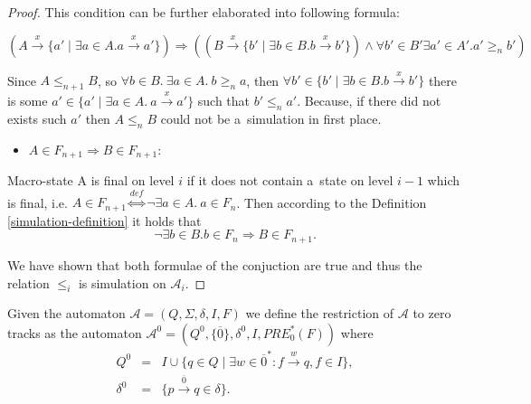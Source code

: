 \begin{proof}
 This condition can be further elaborated into following formula:
 
 \begin{equation}
 (A \overset{x}{\rightarrow} \{a' \mid \exists a \in A. a
 \overset{x}{\rightarrow} a'\}) \Rightarrow ( (B \overset{x}{\rightarrow}
 \{b' \mid \exists b \in B. b \overset{x}{\rightarrow} b'\}) \wedge \forall b'
 \in B' \exists a' \in A'. a' \geq_n b')
 \end{equation}
 
 Since $A \leq_{n+1} B$, so $\forall b \in B.\ \exists a \in A.\ b \geq_n a$,
 then $\forall b' \in \{b' \mid \exists b \in B. b \overset{x}{\rightarrow} b'\}$
 there is some $a' \in \{a' \mid \exists a \in A.\ a \overset{x}{\rightarrow}
 a'\}$ such that $b' \leq_n a'$. Because, if there did not exists such $a'$ then
 $A \leq_n B$ could not be a~simulation in first place.
 
 \begin{itemize}
   \item $A \in F_{n+1} \Rightarrow B \in F_{n+1}$:
 \end{itemize}
 Macro-state A is final on level $i$ if it does not contain a~state on level
 $i\minus 1$ which is final, i.e. $A \in F_{n+1}
 \overset{\mathit{def}}{\Leftrightarrow} \neg\exists a \in A.\ a \in F_n$. Then
 according to the Definition \ref{simulation-definition} it holds that
 \begin{equation}
  \neg\exists b \in B. b \in F_n \Rightarrow B \in F_{n+1}.
 \end{equation}
 
 We have shown that both formulae of the conjuction are true and thus the
 relation $\leq_i$ is simulation on $\mathcal{A}_i$.
 
\end{proof}

% 

\begin{defz}
Given the automaton $\mathcal{A} = (Q, \Sigma, \delta, I, F)$ we define the
restriction of $\mathcal{A}$ to zero tracks as
the automaton $\mathcal{A}^0 = (Q^0, \{\overline{0}\}, \delta^0, I, PRE_0^*(F))$
where
\begin{eqnarray}
 Q^0 & = & I \cup \{q \in Q \mid \exists w \in \overline{0}^*: f
 \overset{w}{\longrightarrow} q, f \in I\},\\
 \delta^0 & = & \{p \overset{\overline{0}}{\longrightarrow} q \in \delta\}.
\end{eqnarray}
\end{defz}

